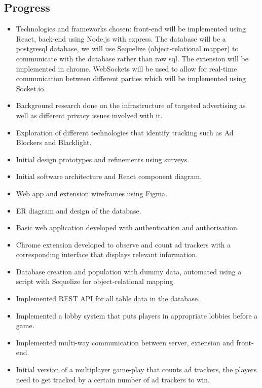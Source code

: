 \documentclass[11pt]{article}
\begin{document}
\subsection{Progress}\label{progress}

\begin{itemize}
\item  Technologies and frameworks chosen: front-end will be implemented using React, back-end using Node.js with express. The database will be a postgresql database, we will use Sequelize (object-relational mapper) to communicate with the database rather than raw sql. The extension will be implemented in chrome. WebSockets will be used to allow for real-time communication between different parties which will be implemented using Socket.io.
\item  Background research done on the infrastructure of targeted advertising as well as different privacy issues involved with it.
\item  Exploration of different technologies that identify tracking such as Ad Blockers and Blacklight.
\item  Initial design prototypes and refinements using surveys.
\item  Initial software architecture and React component diagram.
\item  Web app and extension wireframes using Figma.
\item  ER diagram and design of the database.
\item  Basic web application developed with authentication and authorisation.
\item  Chrome extension developed to observe and count ad trackers with a corresponding interface that displays relevant information.
\item  Database creation and population with dummy data, automated using a script with Sequelize for object-relational mapping.
\item  Implemented REST API for all table data in the database.
\item  Implemented a lobby system that puts players in appropriate lobbies before a game.
\item  Implemented multi-way communication between server, extension and front-end.
\item  Initial version of a multiplayer game-play that counts ad trackers, the players need to get tracked by a certain number of ad trackers to win.

\end{itemize}
\end{document}
